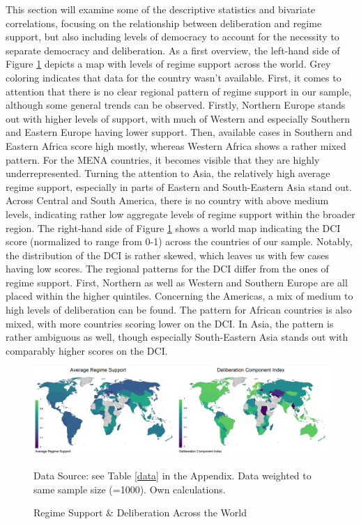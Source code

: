\documentclass[]{article}
\begin{document}
This section will examine some of the descriptive statistics and
bivariate correlations, focusing on the relationship between
deliberation and regime support, but also including levels of democracy
to account for the necessity to separate democracy and deliberation. As
a first overview, the left-hand side of Figure \ref{map2} depicts a map
with levels of regime support across the world. Grey coloring indicates
that data for the country wasn't available. First, it comes to attention
that there is no clear regional pattern of regime support in our sample,
although some general trends can be observed. Firstly, Northern Europe
stands out with higher levels of support, with much of Western and
especially Southern and Eastern Europe having lower support. Then,
available cases in Southern and Eastern Africa score high mostly,
whereas Western Africa shows a rather mixed pattern. For the MENA
countries, it becomes visible that they are highly underrepresented.
Turning the attention to Asia, the relatively high average regime
support, especially in parts of Eastern and South-Eastern Asia stand
out. Across Central and South America, there is no country with above
medium levels, indicating rather low aggregate levels of regime support
within the broader region. The right-hand side of Figure \ref{map2}
shows a world map indicating the DCI score (normalized to range from
0-1) across the countries of our sample. Notably, the distribution of
the DCI is rather skewed, which leaves us with few cases having low
scores. The regional patterns for the DCI differ from the ones of regime
support. First, Northern as well as Western and Southern Europe are all
placed within the higher quintiles. Concerning the Americas, a mix of
medium to high levels of deliberation can be found. The pattern for
African countries is also mixed, with more countries scoring lower on
the DCI. In Asia, the pattern is rather ambiguous as well, though
especially South-Eastern Asia stands out with comparably higher scores
on the DCI.

\begin{figure}[!t]
    \caption{Regime Support \& Deliberation Across the World}
    \label{map2}
    \includegraphics[width=\textwidth]{images/map2.png}
    \flushright
{\tiny Data Source: see Table \ref{data} in the Appendix. Data weighted to same sample size (=1000).  Own calculations.  \par}
\end{figure}
\end{document}

